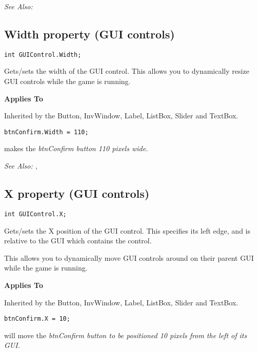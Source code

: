 \it{See Also:} 


\subsection{Width property (GUI controls)}\label{GUIControl.Width}%

\begin{verbatim}
int GUIControl.Width;
\end{verbatim}
Gets/sets the width of the GUI control.  This allows you to dynamically
resize GUI controls while the game is running.

\bf{Applies To}

Inherited by the Button, InvWindow, Label, ListBox, Slider and TextBox.

\begin{verbatim}
btnConfirm.Width = 110;
\end{verbatim}
makes the \it{btnConfirm} button 110 pixels wide.

\it{See Also:} ,


\subsection{X property (GUI controls)}\label{GUIControl.X}%

\begin{verbatim}
int GUIControl.X;
\end{verbatim}
Gets/sets the X position of the GUI control. This specifies its left edge, and is
relative to the GUI which contains the control.

This allows you to dynamically move GUI controls around on their parent GUI while the
game is running.

\bf{Applies To}

Inherited by the Button, InvWindow, Label, ListBox, Slider and TextBox.

\begin{verbatim}
btnConfirm.X = 10;
\end{verbatim}
will move the \it{btnConfirm} button to be positioned 10 pixels from the left of its GUI.

